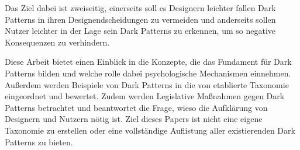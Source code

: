 \documentclass[conference,compsoc,final,a4paper]{IEEEtran}
\begin{document}
Das Ziel dabei ist zweiseitig, einerseits soll es Designern leichter fallen Dark Patterns in ihren Designendscheidungen zu vermeiden und anderseits sollen Nutzer leichter in der Lage sein Dark Patterns zu erkennen, um so negative Konsequenzen zu verhindern.

Diese Arbeit bietet einen Einblick in die Konzepte, die das Fundament für Dark Patterns bilden und welche rolle dabei psychologische Mechanismen einnehmen. Außerdem werden Beispiele von Dark Patterns in die von \citeauthor{Gray_2018} etablierte Taxonomie eingeordnet und bewertet. Zudem werden Legislative Maßnahmen gegen Dark Patterns betrachtet und beantwortet die Frage, wieso die Aufklärung von Designern und Nutzern nötig ist. Ziel dieses Papers ist nicht eine eigene Taxonomie zu erstellen oder eine vollständige Auflistung aller existierenden Dark Patterns zu bieten.


\end{document}
